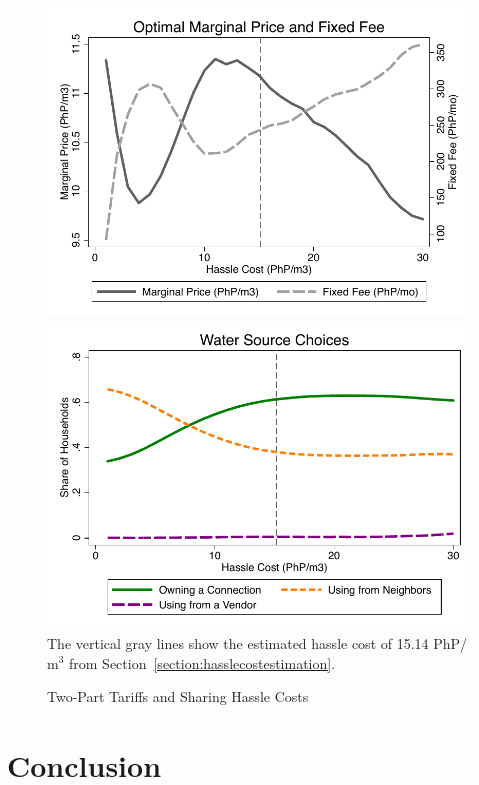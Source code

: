 \documentclass[12pt]{article}
\begin{document}
\begin{figure}
\caption{Two-Part Tariffs and Sharing Hassle Costs}\label{figure:tptshrcosts}
\begin{center}
\includegraphics[scale=.55,valign=t]{tables/tpt_full_graph_prices.pdf}
\includegraphics[scale=.58,valign=t]{tables/tpt_full_graph_shares.pdf}\\
{\footnotesize The vertical gray lines show the estimated hassle cost of 15.14 PhP/$\text{m}^3$ from Section~\ref{section:hasslecostestimation}.}
\end{center}
\end{figure}


\section{Conclusion}\label{section:conclusion}
\end{document}
